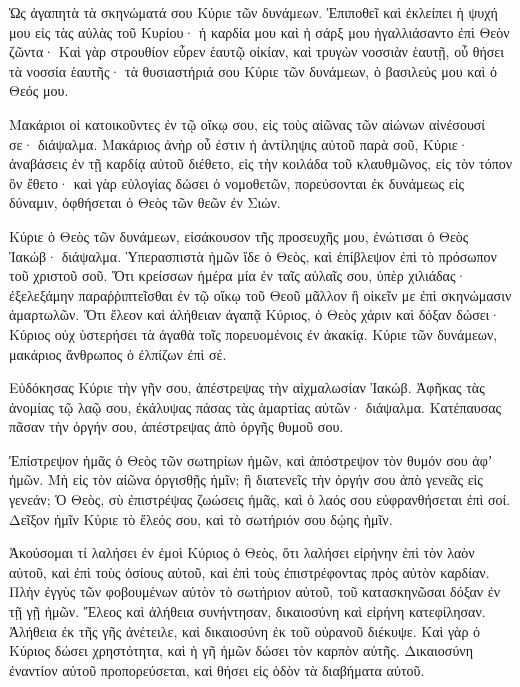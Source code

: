 \begin{spacing}{1.1}
\begin{multicols}{2}
Ὡς ἀγαπητὰ τὰ σκηνώματά σου Κύριε τῶν δυνάμεων.
Ἐπιποθεῖ καὶ ἐκλείπει ἡ ψυχή μου εἰς τὰς αὐλὰς τοῦ Κυρίου· ἡ καρδία μου καὶ ἡ σάρξ μου ἠγαλλιάσαντο ἐπὶ Θεὸν ζῶντα·
Καὶ γὰρ στρουθίον εὗρεν ἑαυτῷ οἰκίαν, καὶ τρυγὼν νοσσιὰν ἑαυτῇ, οὗ θήσει τὰ νοσσία ἑαυτῆς· τὰ θυσιαστήριά σου Κύριε τῶν δυνάμεων, ὁ βασιλεύς μου καὶ ὁ Θεός μου.

Μακάριοι οἱ κατοικοῦντες ἐν τῷ οἴκῳ σου, εἰς τοὺς αἰῶνας τῶν αἰώνων αἰνέσουσί σε· διάψαλμα.
Μακάριος ἀνὴρ οὗ ἐστιν ἡ ἀντίληψις αὐτοῦ παρὰ σοῦ, Κύριε· ἀναβάσεις ἐν τῇ καρδίᾳ αὐτοῦ διέθετο,
εἰς τὴν κοιλάδα τοῦ κλαυθμῶνος, εἰς τὸν τόπον ὃν ἔθετο· καὶ γὰρ εὐλογίας δώσει ὁ νομοθετῶν,
πορεύσονται ἐκ δυνάμεως εἰς δύναμιν, ὀφθήσεται ὁ Θεὸς τῶν θεῶν ἐν Σιών.

Κύριε ὁ Θεὸς τῶν δυνάμεων, εἰσάκουσον τῆς προσευχῆς μου, ἐνώτισαι ὁ Θεὸς Ἰακώβ· διάψαλμα.
Ὑπερασπιστὰ ἡμῶν ἴδε ὁ Θεὸς, καὶ ἐπίβλεψον ἐπὶ τὸ πρόσωπον τοῦ χριστοῦ σοῦ.
Ὅτι κρείσσων ἡμέρα μία ἐν ταῖς αὐλαῖς σου, ὑπὲρ χιλιάδας· ἐξελεξάμην παραῤῥιπτεῖσθαι ἐν τῷ οἴκῳ τοῦ Θεοῦ μᾶλλον ἢ οἰκεῖν με ἐπὶ σκηνώμασιν ἁμαρτωλῶν.
Ὅτι ἔλεον καὶ ἀλήθειαν ἀγαπᾷ Κύριος, ὁ Θεὸς χάριν καὶ δόξαν δώσει· Κύριος οὐχ ὑστερήσει τὰ ἀγαθὰ τοῖς πορευομένοις ἐν ἀκακίᾳ.
Κύριε τῶν δυνάμεων, μακάριος ἄνθρωπος ὁ ἐλπίζων ἐπὶ σέ.

Εὐδόκησας Κύριε τὴν γῆν σου, ἀπέστρεψας τὴν αἰχμαλωσίαν Ἰακώβ.
Ἀφῆκας τὰς ἀνομίας τῷ λαῷ σου, ἐκάλυψας πάσας τὰς ἁμαρτίας αὐτῶν· διάψαλμα.
Κατέπαυσας πᾶσαν τὴν ὀργήν σου, ἀπέστρεψας ἀπὸ ὀργῆς θυμοῦ σου.

Ἐπίστρεψον ἡμᾶς ὁ Θεὸς τῶν σωτηρίων ἡμῶν, καὶ ἀπόστρεψον τὸν θυμόν σου ἀφʼ ἡμῶν.
Μὴ εἰς τὸν αἰῶνα ὀργισθῇς ἡμῖν; ἢ διατενεῖς τὴν ὀργήν σου ἀπὸ γενεᾶς εἰς γενεάν;
Ὁ Θεὸς, σὺ ἐπιστρέψας ζωώσεις ἡμᾶς, καὶ ὁ λαός σου εὐφρανθήσεται ἐπὶ σοί.
Δεῖξον ἡμῖν Κύριε τὸ ἔλεός σου, καὶ τὸ σωτήριόν σου δῴης ἡμῖν.

Ἀκούσομαι τί λαλήσει ἐν ἐμοὶ Κύριος ὁ Θεὸς, ὅτι λαλήσει εἰρήνην ἐπὶ τὸν λαὸν αὐτοῦ, καὶ ἐπὶ τοὺς ὁσίους αὐτοῦ, καὶ ἐπὶ τοὺς ἐπιστρέφοντας πρὸς αὐτὸν καρδίαν.
Πλὴν ἐγγὺς τῶν φοβουμένων αὐτὸν τὸ σωτήριον αὐτοῦ, τοῦ κατασκηνῶσαι δόξαν ἐν τῇ γῇ ἡμῶν.
Ἔλεος καὶ ἀλήθεια συνήντησαν, δικαιοσύνη καὶ εἰρήνη κατεφίλησαν.
Ἀλήθεια ἐκ τῆς γῆς ἀνέτειλε, καὶ δικαιοσύνη ἐκ τοῦ οὐρανοῦ διέκυψε.
Καὶ γὰρ ὁ Κύριος δώσει χρηστότητα, καὶ ἡ γῆ ἡμῶν δώσει τὸν καρπὸν αὐτῆς.
Δικαιοσύνη ἐναντίον αὐτοῦ προπορεύσεται, καὶ θήσει εἰς ὁδὸν τὰ διαβήματα αὐτοῦ.


\end{multicols}
\end{spacing}
